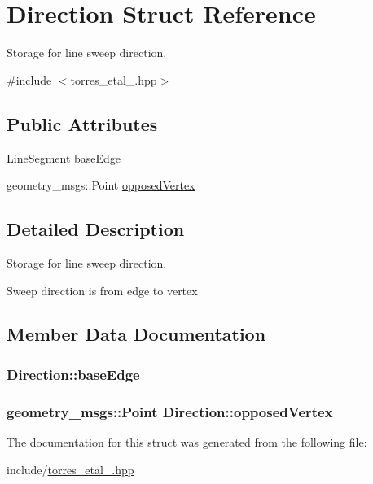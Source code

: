 \hypertarget{struct_direction}{}\section{Direction Struct Reference}
\label{struct_direction}


Storage for line sweep direction.  




{\ttfamily \#include $<$torres\+\_\+etal\+\_.\+hpp$>$}

\subsection*{Public Attributes}
\begin{DoxyCompactItemize}
\item 
\hyperlink{cgutil_8hpp_a7634fe1379961a22350dbd7047b2e8c1}{Line\+Segment} \hyperlink{struct_direction_a21b5ea7a6324787fe23465491f8fa3c4}{base\+Edge}
\item 
geometry\+\_\+msgs\+::\+Point \hyperlink{struct_direction_aa9ac7513359056aeeb007bc5ae5a05a8}{opposed\+Vertex}
\end{DoxyCompactItemize}


\subsection{Detailed Description}
Storage for line sweep direction. 

Sweep direction is from edge to vertex 

\subsection{Member Data Documentation}
\subsubsection[{\texorpdfstring{base\+Edge}{baseEdge}}]{ Direction\+::base\+Edge}\hypertarget{struct_direction_a21b5ea7a6324787fe23465491f8fa3c4}{}\label{struct_direction_a21b5ea7a6324787fe23465491f8fa3c4}
\subsubsection[{\texorpdfstring{opposed\+Vertex}{opposedVertex}}]{\setlength{\rightskip}{0pt plus 5cm}geometry\+\_\+msgs\+::\+Point Direction\+::opposed\+Vertex}\hypertarget{struct_direction_aa9ac7513359056aeeb007bc5ae5a05a8}{}\label{struct_direction_aa9ac7513359056aeeb007bc5ae5a05a8}


The documentation for this struct was generated from the following file\+:\begin{DoxyCompactItemize}
\item 
include/\hyperlink{torres__etal__2016_8hpp}{torres\+\_\+etal\+\_.\+hpp}\end{DoxyCompactItemize}
